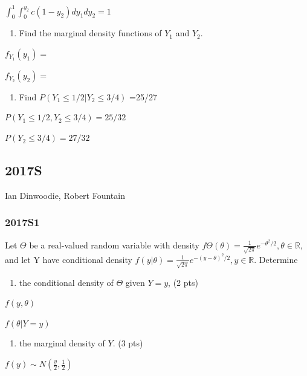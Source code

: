 \documentclass[6pt,Portrait]{article}
\providecommand{\tightlist}{%
  \setlength{\itemsep}{0pt}\setlength{\parskip}{0pt}}
\begin{document}
\(\int_0^1\int_0^{y_2}c(1-y_2)dy_1dy_2=1\)

\begin{enumerate}
\def\labelenumi{(\alph{enumi})}
\setcounter{enumi}{1}
\tightlist
\item
  Find the marginal density functions of \(Y_1\) and \(Y_2\).
\end{enumerate}

\(f_{Y_1}(y_1)=\)

\(f_{Y_2}(y_2)=\)

\begin{enumerate}
\def\labelenumi{(\alph{enumi})}
\setcounter{enumi}{2}
\tightlist
\item
  Find \(P(Y_1\le1/2|Y_2\le3/4)\) =25/27
\end{enumerate}

\(P(Y_1\le1/2, Y_2\le3/4)=25/32\)

\(P(Y_2\le3/4)=27/32\)

\hypertarget{s-10}{%
\subsection{2017S}\label{s-10}}

Ian Dinwoodie, Robert Fountain

\hypertarget{s1-5}{%
\subsubsection{2017S1}\label{s1-5}}

Let \(\Theta\) be a real-valued random variable with density
\(f\Theta(\theta) = \frac1{\sqrt{2\pi}}e^{-\theta^2/2},\theta\in\mathbb R\),
and let Y have conditional density
\(f(y|\theta) = \frac1{\sqrt{2\pi}}e^{-(y-\theta)^2/2},y\in\mathbb R\).
Determine

\begin{enumerate}
\def\labelenumi{(\alph{enumi})}
\tightlist
\item
  the conditional density of \(\Theta\) given \(Y = y\), (2 pts)
\end{enumerate}

\(f(y,\theta)\)

\(f(\theta|Y=y)\)

\begin{enumerate}
\def\labelenumi{(\alph{enumi})}
\setcounter{enumi}{1}
\tightlist
\item
  the marginal density of \(Y\). (3 pts)
\end{enumerate}

\(f(y)\sim N(\frac{y}2,\frac12)\)
\end{document}

